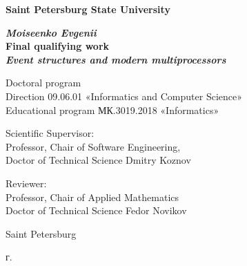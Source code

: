 \restoregeometry
\addtocounter{page}{1}



\begin{titlepage}
\begin{center}

\textbf{Saint Petersburg State University}

\vspace{35mm}

\textbf{\textit{\large Moiseenko Evgenii}} \\[8mm]
\textbf{\large Final qualifying work}\\[3mm]
\textbf{\textit{\large Event structures and modern multiprocessors}}

\vspace{20mm}
Doctoral program \\
Direction 09.06.01 «Informatics and Computer Science»\\
Educational program МК.3019.2018 «Informatics»\\

\vspace{15mm}

\begin{flushright}
\begin{minipage}[t]{0.7\textwidth}
{Scientific Supervisor:} \\
Professor, Chair of Software Engineering, \\ Doctor of Technical Science Dmitry Koznov

\vspace{10mm}

{Reviewer:} \\
Professor, Chair of Applied Mathematics \\ Doctor of Technical Science Fedor Novikov 
\end{minipage}
\end{flushright}

\vfill 

{Saint Petersburg}
\par{\the\year{} г.}
\end{center}
\end{titlepage}
\restoregeometry
\addtocounter{page}{2}

